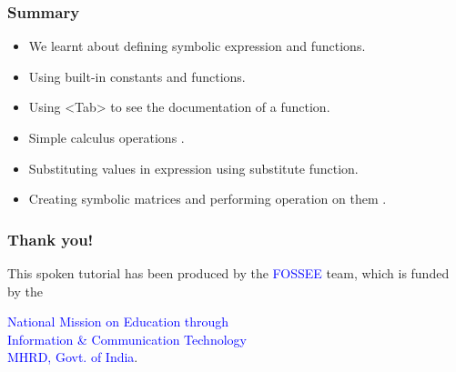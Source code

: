 \documentclass[presentation]{beamer}
\begin{document}
\begin{frame}
\frametitle{Summary}
\label{sec-12}

\begin{itemize}
\item We learnt about defining symbolic expression and functions.
\item Using built-in constants and functions.
\item Using <Tab> to see the documentation of a function.
\item Simple calculus operations .
\item Substituting values in expression using substitute function.
\item Creating symbolic matrices and performing operation on them .
\end{itemize}
\end{frame}
\begin{frame}
\frametitle{Thank you!}
\label{sec-13}

  \begin{block}{}
  \begin{center}
  This spoken tutorial has been produced by the
  \textcolor{blue}{FOSSEE} team, which is funded by the 
  \end{center}
  \begin{center}
    \textcolor{blue}{National Mission on Education through \\
      Information \& Communication Technology \\ 
      MHRD, Govt. of India}.
  \end{center}  
  \end{block}
\end{frame}
\end{document}
